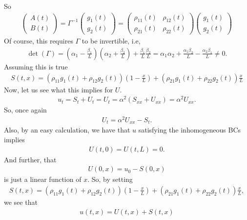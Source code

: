 \documentclass{book}
\theoremstyle{definition}
\begin{document}
So
\begin{align*}
\begin{pmatrix}
A(t)\\B(t)
\end{pmatrix} = \Gamma^{-1}\begin{pmatrix}
g_1(t)\\g_2(t)
\end{pmatrix}=
\begin{pmatrix}
\rho_{11}(t)&\rho_{12}(t)\\
\rho_{21}(t) & \rho_{22}(t)
\end{pmatrix}
\begin{pmatrix}
g_1(t)\\g_2(t)
\end{pmatrix}
\end{align*}
Of course, this requires $\Gamma$ to be invertible, i.e, 
\begin{align*}
\det(\Gamma) = \left(\alpha_1 - \frac{\beta_1}{L}\right)\left(\alpha_2  + \frac{\beta_2}{L}\right) +  \frac{\beta_1}{L}\frac{\beta_2}{L} = \alpha_1 \alpha_2 + \frac{\alpha_1\beta_2}{L} - \frac{\alpha_2\beta_1}{L}\neq 0.
\end{align*}
Assuming this is true
\begin{align*}
S(t,x) = (\rho_{11}g_1(t) + \rho_{12}g_2(t))\left(1 - \frac{x}{L} \right) + (\rho_{21}g_1(t) + \rho_{22}g_2(t))\frac{x}{L}
\end{align*}
Now, let us see what this implies for $U$. 
\begin{align*}
u_t = S_t + U_t = U_t = \alpha^2(S_{xx} +  U_{xx}) = \alpha^2 U_{xx}.
\end{align*}
So, once again
\begin{align*}
U_t = \alpha^2 U_{xx} - S_t.
\end{align*}
Also, by an easy calculation, we have that $u$ satisfying the inhomogeneous BCs implies
\begin{align*}
U(t,0) = U(t,L) = 0.
\end{align*}
And further, that
\begin{align*}
U(0,x)= u_0 - S(0,x)
\end{align*}
is just a linear function of $x$. So, by setting 
\begin{align*}
S(t,x)= (\rho_{11}g_1(t) + \rho_{12}g_2(t))\left(1 - \frac{x}{L} \right) + (\rho_{21}g_1(t) + \rho_{22}g_2(t))\frac{x}{L},
\end{align*}
we see that
\begin{align*}
u(t,x) = U(t,x) + S(t,x)
\end{align*}
\end{document}
